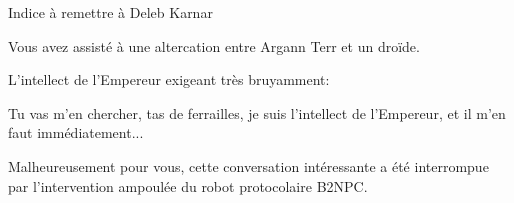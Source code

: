 \documentclass{article}
\begin{document}
\begin{samepage}
    Indice à remettre à Deleb Karnar
    \nobreak
    \begin{framed}
        Vous avez assisté à une altercation entre Argann Terr et un droïde.

        \nobreak

        L'intellect de l'Empereur exigeant très bruyamment:

        \nobreak

        \og Tu vas m'en chercher, tas de ferrailles, je suis l'intellect de
        l'Empereur, et il m'en faut immédiatement...\fg{}

        \nobreak

        Malheureusement pour vous, cette conversation intéressante a été
        interrompue par l'intervention ampoulée du robot protocolaire B2NPC.
    \end{framed}
\end{samepage}
\end{document}
